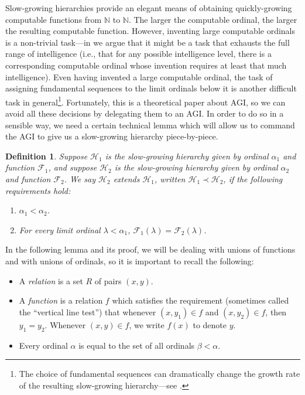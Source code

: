 \documentclass{article}
\newtheorem{definition}[theorem]{Definition}
\begin{document}
Slow-growing hierarchies provide an elegant means of obtaining quickly-growing
computable functions from $\mathbb N$ to $\mathbb N$.
The larger the computable ordinal, the larger the resulting computable function.
However, inventing large computable ordinals is a non-trivial task---in
\cite{ioi2} we argue that it might be a task that exhausts the full range
of intelligence (i.e., that for any possible intelligence level, there is a corresponding
computable ordinal whose invention requires at least that much intelligence).
Even having invented a large computable ordinal, the task of assigning fundamental
sequences to the limit ordinals below it is another difficult task in general\footnote{The
choice of fundamental sequences can dramatically change the growth rate of the
resulting slow-growing hierarchy---see \cite{weiermann1997sometimes}.}.
Fortunately, this is a theoretical paper about AGI, so we can avoid all these decisions
by delegating them to an AGI. In order to do so in a sensible way, we need a certain
technical lemma which will allow us to command the AGI to give us a slow-growing hierarchy
piece-by-piece.

\begin{definition}
\label{fundamentalsequenceextensiondef}
    Suppose $\mathcal H_1$ is the slow-growing hierarchy given by
    ordinal $\alpha_1$ and function $\mathcal F_1$, and suppose
    $\mathcal H_2$ is the slow-growing hierarchy given by
    ordinal $\alpha_2$ and function $\mathcal F_2$.
    We say \emph{$\mathcal H_2$ extends $\mathcal H_1$},
    written $\mathcal H_1\prec \mathcal H_2$, if the following
    requirements hold:
    \begin{enumerate}
        \item
        $\alpha_1<\alpha_2$.
        \item
        For every limit ordinal $\lambda<\alpha_1$,
        $\mathcal F_1(\lambda)=\mathcal F_2(\lambda)$.
    \end{enumerate}
\end{definition}

In the following lemma and its proof, we will be dealing with unions of functions
and with unions of ordinals,
so it is important to recall the following:
\begin{itemize}
    \item A \emph{relation} is a set $R$ of pairs $(x,y)$.
    \item A \emph{function} is a relation $f$ which satisfies the requirement
    (sometimes called the ``vertical line test'') that whenever $(x,y_1)\in f$
    and $(x,y_2)\in f$, then $y_1=y_2$. Whenever $(x,y)\in f$, we write $f(x)$
    to denote $y$.
    \item Every ordinal $\alpha$ is equal to the set of all ordinals $\beta<\alpha$.
\end{itemize}
\end{document}
